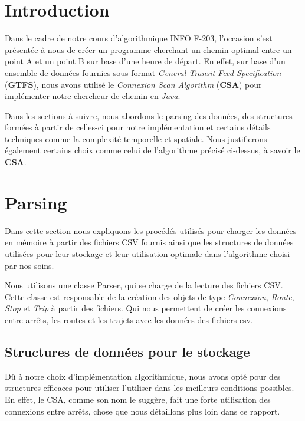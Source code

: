 \documentclass[12pt,openany]{article}
\begin{document}
\clearpage


\tableofcontents

\newpage


\section{Introduction}
Dans le cadre de notre cours d'algorithmique INFO F-203, l'occasion s'est présentée à nous de créer un programme cherchant un chemin optimal
entre un point A et un point B sur base d'une heure de départ. En effet, sur base d'un ensemble de données
fournies sous format \emph{General Transit Feed Specification} (\textbf{GTFS}), nous avons utilisé le \emph{Connexion Scan Algorithm} (\textbf{CSA})
pour implémenter notre chercheur de chemin en \emph{Java}. 

Dans les sections à suivre, nous abordons le parsing des données, des structures formées à partir de celles-ci pour notre
implémentation et certains détails techniques comme la complexité temporelle et spatiale. Nous justifierons également certains choix
comme celui de l'algorithme précisé ci-dessus, à savoir le \textbf{CSA}.


\section{Parsing}
Dans cette section nous expliquons les procédés utilisés pour charger les données en mémoire à partir des fichiers CSV fournis ainsi que
les structures de données utilisées pour leur stockage et leur utilisation optimale dans l'algorithme choisi par nos soins.

Nous utilisons une classe Parser, qui se charge de la lecture des fichiers CSV.
Cette classe est responsable de la création des objets de type \emph{Connexion}, \emph{Route}, \emph{Stop} et \emph{Trip} à partir des fichiers.
Qui nous permettent de créer les connexions entre arrêts, les routes et les trajets avec les données des fichiers csv.

\subsection{Structures de données pour le stockage}
Dû à notre choix d'implémentation algorithmique, nous avons opté pour des structures efficaces pour utiliser l'utiliser dans
les meilleurs conditions possibles. En effet, le CSA, comme son nom le suggère, fait une forte utilisation des connexions entre arrêts,
chose que nous détaillons plus loin dans ce rapport.
\end{document}
